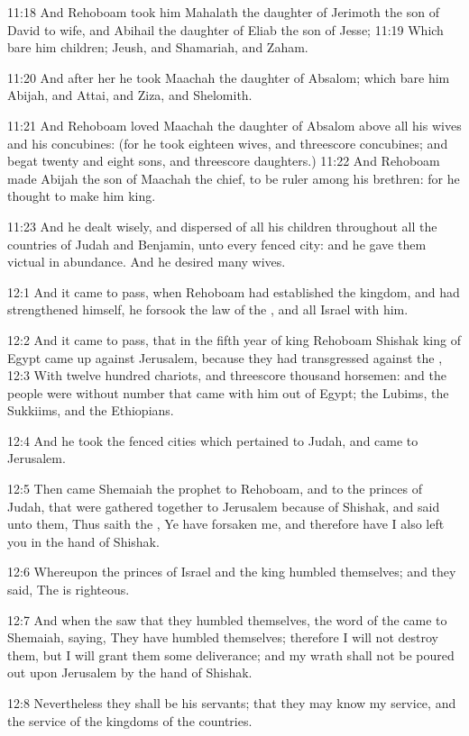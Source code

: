 11:18 And Rehoboam took him Mahalath the daughter of Jerimoth the son of David to wife, and Abihail the daughter of Eliab the son of Jesse; 11:19 Which bare him children; Jeush, and Shamariah, and Zaham.

11:20 And after her he took Maachah the daughter of Absalom; which bare him Abijah, and Attai, and Ziza, and Shelomith.

11:21 And Rehoboam loved Maachah the daughter of Absalom above all his wives and his concubines: (for he took eighteen wives, and threescore concubines; and begat twenty and eight sons, and threescore daughters.)  11:22 And Rehoboam made Abijah the son of Maachah the chief, to be ruler among his brethren: for he thought to make him king.

11:23 And he dealt wisely, and dispersed of all his children throughout all the countries of Judah and Benjamin, unto every fenced city: and he gave them victual in abundance. And he desired many wives.

12:1 And it came to pass, when Rehoboam had established the kingdom, and had strengthened himself, he forsook the law of the \LORD, and all Israel with him.

12:2 And it came to pass, that in the fifth year of king Rehoboam Shishak king of Egypt came up against Jerusalem, because they had transgressed against the \LORD, 12:3 With twelve hundred chariots, and threescore thousand horsemen: and the people were without number that came with him out of Egypt; the Lubims, the Sukkiims, and the Ethiopians.

12:4 And he took the fenced cities which pertained to Judah, and came to Jerusalem.

12:5 Then came Shemaiah the prophet to Rehoboam, and to the princes of Judah, that were gathered together to Jerusalem because of Shishak, and said unto them, Thus saith the \LORD, Ye have forsaken me, and therefore have I also left you in the hand of Shishak.

12:6 Whereupon the princes of Israel and the king humbled themselves; and they said, The \LORD is righteous.

12:7 And when the \LORD saw that they humbled themselves, the word of the \LORD came to Shemaiah, saying, They have humbled themselves; therefore I will not destroy them, but I will grant them some deliverance; and my wrath shall not be poured out upon Jerusalem by the hand of Shishak.

12:8 Nevertheless they shall be his servants; that they may know my service, and the service of the kingdoms of the countries.

